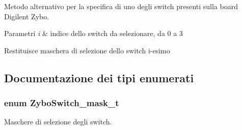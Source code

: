 Metodo alternativo per la specifica di uno degli switch presenti sulla board Digilent Zybo. 


\begin{DoxyParams}{Parametri}
{\em i} & indice dello switch da selezionare, da 0 a 3 \\
\hline
\end{DoxyParams}
\begin{DoxyReturn}{Restituisce}
maschera di selezione dello switch i-\/esimo 
\end{DoxyReturn}


\subsection{Documentazione dei tipi enumerati}
\hypertarget{group___switch_ga2e0602a824354f25c395f938caba3703}{
\subsubsection[{Zybo\+Switch\+\_\+mask\+\_\+t}]{\setlength{\rightskip}{0pt plus 5cm}enum {\bf Zybo\+Switch\+\_\+mask\+\_\+t}}}\label{group___switch_ga2e0602a824354f25c395f938caba3703}


Maschere di selezione degli switch. 

